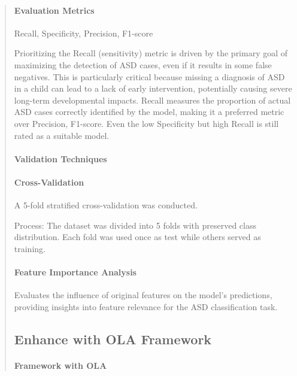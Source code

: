 \documentclass[runningheads]{llncs}
\begin{document}
\begin{abstract}
\paragraph{\textbf{Evaluation Metrics}} Recall, Specificity, Precision, F1-score

Prioritizing the Recall (sensitivity) metric is driven by the primary goal of maximizing the detection of ASD cases, even if it results in some false negatives. This is particularly critical because missing a diagnosis of ASD in a child can lead to a lack of early intervention, potentially causing severe long-term developmental impacts. Recall measures the proportion of actual ASD cases correctly identified by the model, making it a preferred metric over Precision, F1-score. Even the low Specificity but high Recall is still rated as a suitable model.

\paragraph{\textbf{Validation Techniques}}


\paragraph{Cross-Validation}

A 5-fold stratified cross-validation was conducted.  

Process: The dataset was divided into 5 folds with preserved class distribution. Each fold was used once as test while others served as training.  

\paragraph{Feature Importance Analysis}

Evaluates the influence of original features on the model's predictions, providing insights into feature relevance for the ASD classification task.



\subsection{Enhance with OLA Framework}

\paragraph{Framework with OLA}


\end{abstract}
\end{document}
